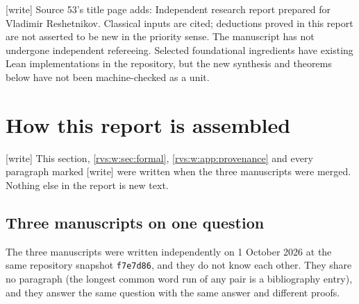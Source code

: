 \documentclass[11pt,letterpaper]{article}
\numberwithin{equation}{section}
\theoremstyle{definition}
\theoremstyle{remark}
\newcommand{\RepoShort}{f7e7d86}
\newcommand{\wtag}{\textup{[write]}}%
\begin{document}
\noindent\wtag{} Source 53's title page adds: Independent research report
prepared for Vladimir Reshetnikov. Classical inputs are cited; deductions
proved in this report are not asserted to be new in the priority sense. The
manuscript has not undergone independent refereeing. Selected foundational
ingredients have existing Lean implementations in the repository, but the new
synthesis and theorems below have not been machine-checked as a unit.


\section{How this report is assembled}\label{rvs:w:sec:assembly}

\wtag{} This section, \cref{rvs:w:sec:formal}, \cref{rvs:w:app:provenance}
and every paragraph marked \wtag{} were written when the three manuscripts
were merged.  Nothing else in the report is new text.

\subsection{Three manuscripts on one question}

The three manuscripts were written independently on 1 October 2026 at the
same repository snapshot \texttt{\RepoShort}, and they do not know each
other.  They share no paragraph (the longest common word run of any pair is a
bibliography entry), and they answer the same question with the same answer
and different proofs.
\end{document}
